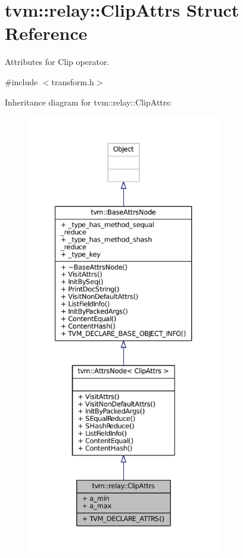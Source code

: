 \hypertarget{structtvm_1_1relay_1_1ClipAttrs}{}\section{tvm\+:\+:relay\+:\+:Clip\+Attrs Struct Reference}
\label{structtvm_1_1relay_1_1ClipAttrs}


Attributes for Clip operator.  




{\ttfamily \#include $<$transform.\+h$>$}



Inheritance diagram for tvm\+:\+:relay\+:\+:Clip\+Attrs\+:
\nopagebreak
\begin{figure}[H]
\begin{center}
\leavevmode
\includegraphics[height=550pt]{structtvm_1_1relay_1_1ClipAttrs__inherit__graph}
\end{center}
\end{figure}


